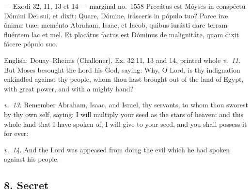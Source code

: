 \begin{appointedlatin}{ --- Exodi 32, 11, 13 et 14 --- marginal no.\ 1558}
Precátus est Móyses in conspéctu Dómini Dei sui, et dixit: Quare, Dómine,
irásceris in pópulo tuo? Parce iræ ánimæ tuæ: meménto Abraham, Isaac, et
Iacob, quibus iurásti dare terram fluéntem lac et mel. Et placátus factus est
Dóminus de malignitáte, quam dixit fácere pópulo suo.
\end{appointedlatin}

\begin{namedtranslation}{English: Douay--Rheims (Challoner), Ex. 32:11, 13 and 14, printed whole}
\textit{v.~11.} But Moses besought the Lord his God, saying: Why, O Lord, is
thy indignation enkindled against thy people, whom thou hast brought out of
the land of Egypt, with great power, and with a mighty hand?

\textit{v.~13.} Remember Abraham, Isaac, and Israel, thy servants, to whom
thou sworest by thy own self, saying: I will multiply your seed as the stars
of heaven: and this whole land that I have spoken of, I will give to your
seed, and you shall possess it for ever:

\textit{v.~14.} And the Lord was appeased from doing the evil which he had
spoken against his people.
\end{namedtranslation}


\elementguard
\subsection*{8. Secret }

